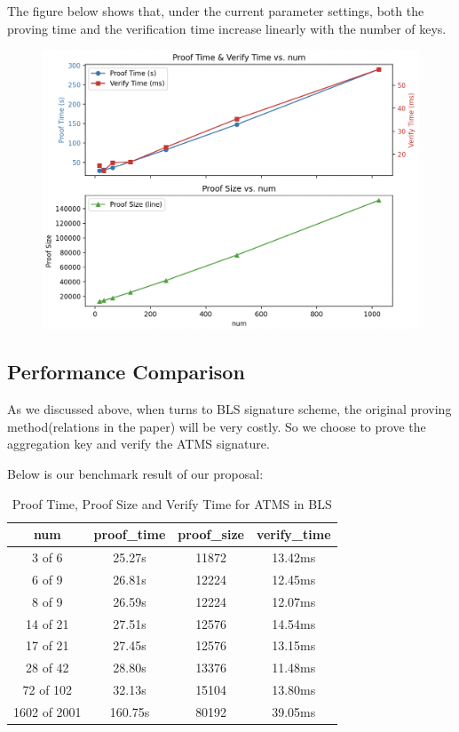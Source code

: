 \documentclass{article}
\begin{document}
The figure below shows that, under the current parameter settings, both the proving time and the verification time increase linearly with the number of keys.
\begin{figure}[htbp]
    \centering
    \includegraphics[width=1\linewidth]{test2.png}
    \label{fig:enter-label}
\end{figure}



\subsection{Performance Comparison}

As we discussed above, when turns to BLS signature scheme, the original proving method(relations in the paper) will be very costly. So we choose to prove the aggregation key and verify the ATMS signature.

Below is our benchmark result of our proposal:


\begin{table}[H]
\centering
\begin{tabular}{c|c|c|c}
\hline
\textbf{num} & \textbf{proof\_time} & \textbf{proof\_size} & \textbf{verify\_time} \\ \hline
3 of 6 & 25.27s & 11872 & 13.42ms \\
6 of 9 & 26.81s & 12224 & 12.45ms \\
8 of 9 & 26.59s & 12224 & 12.07ms \\
14 of 21 & 27.51s & 12576 & 14.54ms \\
17 of 21 & 27.45s & 12576 & 13.15ms \\
28 of 42 & 28.80s & 13376 & 11.48ms \\
72 of 102 & 32.13s & 15104 & 13.80ms \\
1602 of 2001 & 160.75s & 80192 & 39.05ms \\ \hline
\end{tabular}
\caption{Proof Time, Proof Size and Verify Time for ATMS in BLS}
\end{table}
\end{document}
